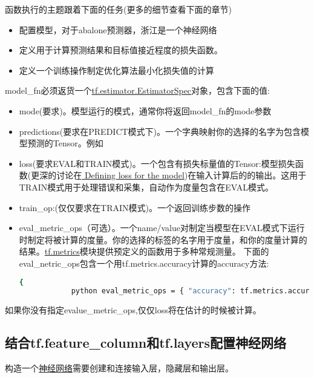 函数执行的主题跟着下面的任务(更多的细节查看下面的章节)
\begin{itemize}
		\item 配置模型，对于abalone预测器，浙江是一个神经网络
		\item 定义用于计算预测结果和目标值接近程度的损失函数。
		\item 定义一个训练操作制定优化算法最小化损失值的计算
\end{itemize}
model\_fn必须返货一个\href{https://www.tensorflow.org/api_docs/python/tf/estimator/EstimatorSpecC}{tf.estimator.EstimatorSpec}对象，包含下面的值:
\begin{itemize}
	\item mode(要求)。模型运行的模式，通常你将返回model\_fn的mode参数
	\item predictions(要求在PREDICT模式下)。一个字典映射你的选择的名字为包含模型预测的Tensor。例如
	\item loss(要求EVAL和TRAIN模式)。一个包含有损失标量值的Tensor:模型损失函数(更深的讨论在\href{https://www.tensorflow.org/extend/estimators#defining_loss}{ Defining loss for the model})在输入计算后的的输出。这用于TRAIN模式用于处理错误和采集，自动作为度量包含在EVAL模式。
	\item train\_op:(仅仅要求在TRAIN模式)。一个返回训练步数的操作
	\item eval\_metric\_ops（可选）。一个name/value对制定当模型在EVAL模式下运行时制定将被计算的度量。你的选择的标签的名字用于度量，和你的度量计算的结果。\href{https://www.tensorflow.org/api_docs/python/tf/metrics}{tf.metrics}模块提供预定义的函数用于多种常规测量。
		下面的eval\_netric\_ops包含一个用tf.metrics.accuracy计算的accuracy方法:
		\begin{lstlisting}[language=Bash]{
			python eval_metric_ops = { "accuracy": tf.metrics.accuracy(labels, predictions) }}
		\end{lstlisting}
\end{itemize}
如果你没有指定evalue\_metric\_ops,仅仅loss将在估计的时候被计算。
\subsection{结合tf.feature\_column和tf.layers配置神经网络}
构造一个\href{https://en.wikipedia.org/wiki/Artificial_neural_network}{神经网络}需要创建和连接输入层，隐藏层和输出层。

